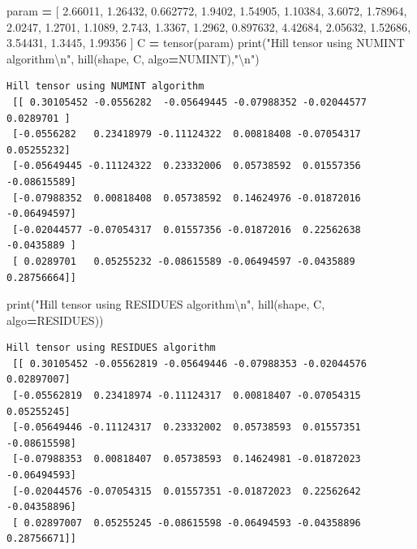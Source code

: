 \documentclass[
  a4paper,
  numbers=noendperiod,
  DIV=12]{scrreprt}
\newenvironment{Shaded}{\begin{snugshade}}{\end{snugshade}}
\newcommand{\BuiltInTok}[1]{#1}
\newcommand{\CharTok}[1]{\textcolor[rgb]{0.31,0.60,0.02}{#1}}
\newcommand{\FloatTok}[1]{\textcolor[rgb]{0.00,0.00,0.81}{#1}}
\newcommand{\NormalTok}[1]{#1}
\newcommand{\OperatorTok}[1]{\textcolor[rgb]{0.81,0.36,0.00}{\textbf{#1}}}
\newcommand{\StringTok}[1]{\textcolor[rgb]{0.31,0.60,0.02}{#1}}
\begin{document}
\begin{Shaded}
\begin{Highlighting}[]
\NormalTok{param }\OperatorTok{=}\NormalTok{ [ }\FloatTok{2.66011}\NormalTok{, }\FloatTok{1.26432}\NormalTok{, }\FloatTok{0.662772}\NormalTok{, }\FloatTok{1.9402}\NormalTok{, }\FloatTok{1.54905}\NormalTok{, }\FloatTok{1.10384}\NormalTok{, }\FloatTok{3.6072}\NormalTok{, }\FloatTok{1.78964}\NormalTok{, }\FloatTok{2.0247}\NormalTok{, }\FloatTok{1.2701}\NormalTok{, }\FloatTok{1.1089}\NormalTok{, }\FloatTok{2.743}\NormalTok{, }\FloatTok{1.3367}\NormalTok{, }\FloatTok{1.2962}\NormalTok{, }\FloatTok{0.897632}\NormalTok{, }\FloatTok{4.42684}\NormalTok{, }\FloatTok{2.05632}\NormalTok{, }\FloatTok{1.52686}\NormalTok{, }\FloatTok{3.54431}\NormalTok{, }\FloatTok{1.3445}\NormalTok{, }\FloatTok{1.99356}\NormalTok{ ]}
\NormalTok{C }\OperatorTok{=}\NormalTok{ tensor(param)}
\BuiltInTok{print}\NormalTok{(}\StringTok{"Hill tensor using NUMINT algorithm}\CharTok{\textbackslash{}n}\StringTok{"}\NormalTok{, hill(shape, C, algo}\OperatorTok{=}\NormalTok{NUMINT),}\StringTok{"}\CharTok{\textbackslash{}n}\StringTok{"}\NormalTok{)}
\end{Highlighting}
\end{Shaded}

\begin{verbatim}
Hill tensor using NUMINT algorithm
 [[ 0.30105452 -0.0556282  -0.05649445 -0.07988352 -0.02044577  0.0289701 ]
 [-0.0556282   0.23418979 -0.11124322  0.00818408 -0.07054317  0.05255232]
 [-0.05649445 -0.11124322  0.23332006  0.05738592  0.01557356 -0.08615589]
 [-0.07988352  0.00818408  0.05738592  0.14624976 -0.01872016 -0.06494597]
 [-0.02044577 -0.07054317  0.01557356 -0.01872016  0.22562638 -0.0435889 ]
 [ 0.0289701   0.05255232 -0.08615589 -0.06494597 -0.0435889   0.28756664]] 
\end{verbatim}

\begin{Shaded}
\begin{Highlighting}[]
\BuiltInTok{print}\NormalTok{(}\StringTok{"Hill tensor using RESIDUES algorithm}\CharTok{\textbackslash{}n}\StringTok{"}\NormalTok{, hill(shape, C, algo}\OperatorTok{=}\NormalTok{RESIDUES))}
\end{Highlighting}
\end{Shaded}

\begin{verbatim}
Hill tensor using RESIDUES algorithm
 [[ 0.30105452 -0.05562819 -0.05649446 -0.07988353 -0.02044576  0.02897007]
 [-0.05562819  0.23418974 -0.11124317  0.00818407 -0.07054315  0.05255245]
 [-0.05649446 -0.11124317  0.23332002  0.05738593  0.01557351 -0.08615598]
 [-0.07988353  0.00818407  0.05738593  0.14624981 -0.01872023 -0.06494593]
 [-0.02044576 -0.07054315  0.01557351 -0.01872023  0.22562642 -0.04358896]
 [ 0.02897007  0.05255245 -0.08615598 -0.06494593 -0.04358896  0.28756671]]
\end{verbatim}
\end{document}
